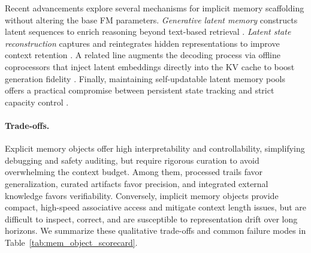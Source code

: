 \begin{itemize}[leftmargin=*]
Recent advancements explore several mechanisms for implicit memory scaffolding without altering the base FM parameters. \textit{Generative latent memory} constructs latent sequences to enrich reasoning beyond text-based retrieval \citep{zhang2025memgenweavinggenerativelatent}. \textit{Latent state reconstruction} captures and reintegrates hidden representations to improve context retention \citep{dillon2025contextualmemoryreweavinglarge}. A related line augments the decoding process via offline coprocessors that inject latent embeddings directly into the KV cache to boost generation fidelity \citep{liu2024deliberationlatentspacedifferentiable, sun2025enhancinglatentcomputationtransformers}. Finally, maintaining self-updatable latent memory pools offers a practical compromise between persistent state tracking and strict capacity control \citep{wang2024memoryllmselfupdatablelargelanguage, wang2025mextendingmemoryllmscalable}.

\end{itemize}






\paragraph{Trade-offs.}
Explicit memory objects offer high interpretability and controllability, simplifying debugging and safety auditing, but require rigorous curation to avoid overwhelming the context budget. Among them, processed trails favor generalization, curated artifacts favor precision, and integrated external knowledge favors verifiability. Conversely, implicit memory objects provide compact, high-speed associative access and mitigate context length issues, but are difficult to inspect, correct, and are susceptible to representation drift over long horizons. We summarize these qualitative trade-offs and common failure modes in Table~\ref{tab:mem_object_scorecard}.



\newcommand{\Dfull}{\textcolor{blue!80!black}{\raisebox{0.15ex}{\large$\bullet$}}} 
\newcommand{\Dmid}{\textcolor{cyan!80}{\raisebox{0.15ex}{\large$\bullet$}}} 
\newcommand{\Dnone}{\textcolor{black!10}{\raisebox{0.15ex}{\large$\bullet$}}}


\newcommand{\Hstrut}{\rule{0pt}{3.2ex}}


